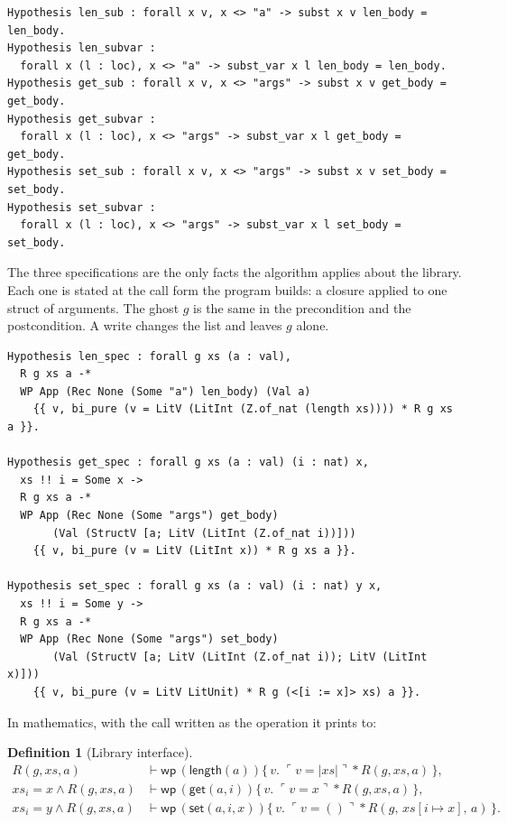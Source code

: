 \documentclass[11pt]{article}
\newtheorem{definition}[theorem]{Definition}
\newcommand{\sep}{\mathbin{*}}
\newcommand{\Wpre}{\mathsf{wp}}
\newcommand{\pure}[1]{\ulcorner #1 \urcorner}
\begin{document}
\begin{lstlisting}
Hypothesis len_sub : forall x v, x <> "a" -> subst x v len_body = len_body.
Hypothesis len_subvar :
  forall x (l : loc), x <> "a" -> subst_var x l len_body = len_body.
Hypothesis get_sub : forall x v, x <> "args" -> subst x v get_body = get_body.
Hypothesis get_subvar :
  forall x (l : loc), x <> "args" -> subst_var x l get_body = get_body.
Hypothesis set_sub : forall x v, x <> "args" -> subst x v set_body = set_body.
Hypothesis set_subvar :
  forall x (l : loc), x <> "args" -> subst_var x l set_body = set_body.
\end{lstlisting}

The three specifications are the only facts the algorithm applies about the library.
Each one is stated at the call form the program builds: a closure applied to one struct of arguments.
The ghost \(g\) is the same in the precondition and the postcondition.
A write changes the list and leaves \(g\) alone.

\begin{lstlisting}
Hypothesis len_spec : forall g xs (a : val),
  R g xs a -*
  WP App (Rec None (Some "a") len_body) (Val a)
    {{ v, bi_pure (v = LitV (LitInt (Z.of_nat (length xs)))) * R g xs a }}.

Hypothesis get_spec : forall g xs (a : val) (i : nat) x,
  xs !! i = Some x ->
  R g xs a -*
  WP App (Rec None (Some "args") get_body)
       (Val (StructV [a; LitV (LitInt (Z.of_nat i))]))
    {{ v, bi_pure (v = LitV (LitInt x)) * R g xs a }}.

Hypothesis set_spec : forall g xs (a : val) (i : nat) y x,
  xs !! i = Some y ->
  R g xs a -*
  WP App (Rec None (Some "args") set_body)
       (Val (StructV [a; LitV (LitInt (Z.of_nat i)); LitV (LitInt x)]))
    {{ v, bi_pure (v = LitV LitUnit) * R g (<[i := x]> xs) a }}.
\end{lstlisting}

In mathematics, with the call written as the operation it prints to:

\begin{definition}[Library interface]
\[
\begin{aligned}
R(g, xs, a) &\vdash \Wpre\,(\mathsf{length}(a))
  \{\,v.\; \pure{v = \lvert xs \rvert} \sep R(g, xs, a)\,\},\\
xs_i = x \land R(g, xs, a) &\vdash \Wpre\,(\mathsf{get}(a, i))
  \{\,v.\; \pure{v = x} \sep R(g, xs, a)\,\},\\
xs_i = y \land R(g, xs, a) &\vdash \Wpre\,(\mathsf{set}(a, i, x))
  \{\,v.\; \pure{v = ()} \sep R(g,\, xs[i \mapsto x],\, a)\,\}.
\end{aligned}
\]
\end{definition}
\end{document}
